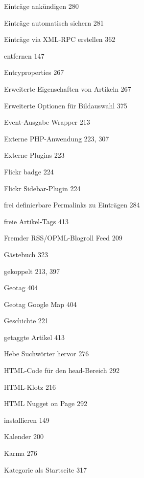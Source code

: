 \documentclass{book}
\renewcommand\subitem{\par}
\begin{document}
\begin{multicols}{2}
\begin{osp-index}
    \subitem Eintr\"age ank\"undigen\hspace{1mm} 280
    \subitem Eintr\"age automatisch sichern\hspace{1mm} 281
    \subitem Eintr\"age via XML-RPC erstellen\hspace{1mm} 362
    \subitem entfernen\hspace{1mm} 147
    \subitem Entryproperties\hspace{1mm} 267
    \subitem Erweiterte Eigenschaften von Artikeln\hspace{1mm} 267
    \subitem Erweiterte Optionen f\"ur Bildauswahl\hspace{1mm} 375
    \subitem Event-Ausgabe Wrapper\hspace{1mm} 213
    \subitem Externe PHP-Anwendung\hspace{1mm} 223, 307
    \subitem Externe Plugins\hspace{1mm} 223
    \subitem Flickr badge\hspace{1mm} 224
    \subitem Flickr Sidebar-Plugin\hspace{1mm} 224
    \subitem frei definierbare Permalinks zu Eintr\"agen\hspace{1mm} 
		284
    \subitem freie Artikel-Tags\hspace{1mm} 413
    \subitem Fremder RSS/OPML-Blogroll Feed\hspace{1mm} 209
    \subitem G\"astebuch\hspace{1mm} 323
    \subitem gekoppelt\hspace{1mm} 213, 397
    \subitem Geotag\hspace{1mm} 404
    \subitem Geotag Google Map\hspace{1mm} 404
    \subitem Geschichte\hspace{1mm} 221
    \subitem getaggte Artikel\hspace{1mm} 413
    \subitem Hebe Suchw\"orter hervor\hspace{1mm} 276
    \subitem HTML-Code f\"ur den head-Bereich\hspace{1mm} 292
    \subitem HTML-Klotz\hspace{1mm} 216
    \subitem HTML Nugget on Page\hspace{1mm} 292
    \subitem installieren\hspace{1mm} 149
    \subitem Kalender\hspace{1mm} 200
    \subitem Karma\hspace{1mm} 276
    \subitem Kategorie als Startseite\hspace{1mm} 317

\end{osp-index}
\end{multicols}
\end{document}
